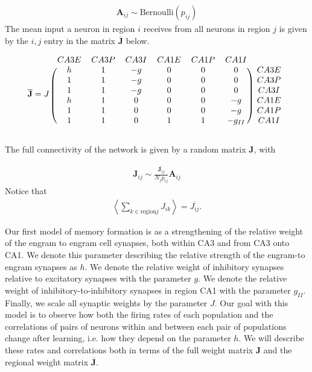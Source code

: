 \documentclass [12pt]{amsart}
\newcommand{\matr}[1]{\mathbf{#1}} %
\newcommand\abk[1]{\left\langle #1 \right\rangle}
\theoremstyle{definition}
\begin{document}
\begin{align*}
\matr A_{ij} \sim \mathrm{Bernoulli}(p_{ij})
\end{align*}
The mean input a neuron in region $i$ receives from all neurons in region $j$ is given by the $i,j$ entry in the matrix $\overline{\matr J}$ below. 


\[
\overline{\matr J} = J \,\, \begin{blockarray}{ccccccc}
 CA3 E & CA3 P & CA3 I & CA1 E & CA1 P  & CA1 I \\
\begin{block}{(cccccc)c}
h & 1 & -g & 0 & 0 & 0 &CA3 E \\
 1 & 1 & -g & 0 & 0 & 0 &CA3 P\\
 1 & 1 & -g & 0 & 0 & 0 &CA3 I \\
h & 1 & 0 & 0 & 0 & -g &CA1 E    \\
1 & 1 & 0 & 0 & 0 & -g &CA1 P  \\
1 & 1& 0 & 1 & 1 & -g_{II}  &CA1 I  \\
\end{block}
\end{blockarray}
 \]
 


The full connectivity of the network is given by a random matrix $\matr J$, with 

\begin{align*}
\matr J_{ij} \sim \frac{\overline{\matr J_{ij}}}{N_j p_{ij}}\matr A_{ij}
\end{align*}
Notice that 
\begin{align*}
\abk{\sum_{k\in \mathrm{ region } j}J_{ik}}= \overline{J_{ij}}.
\end{align*}

Our first model of memory formation is as a strengthening of the relative weight of the engram to engram cell synapses, both within CA3 and from CA3 onto CA1. We denote this parameter describing the relative strength of the engram-to engram synapses as $h$.
We denote the relative weight of inhibitory synapses relative to excitatory synapses with the parameter $g$. We denote the relative weight of inhibitory-to-inhibitory synapses in region CA1 with the parameter $g_{II}$. Finally, we scale all synaptic weights by the parameter $J$. 
Our goal with this model is to observe how both the firing rates of each population and the correlations of pairs of neurons within and between each pair of populations change after learning, i.e. how they depend on the parameter $h$. 
We will describe these rates and correlations both in terms of the full weight matrix $\matr J$ and the regional weight matrix $\overline {\matr J}$. 
\end{document}
